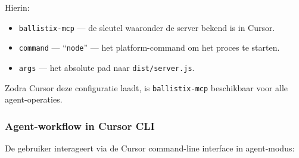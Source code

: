 Hierin:

\begin{itemize}
  \item \texttt{ballistix-mcp} — de sleutel waaronder de server bekend is in Cursor.
  \item \texttt{command} — ``\texttt{node}'' — het platform-command om het proces te starten.
  \item \texttt{args} — het absolute pad naar \texttt{dist/server.js}.
\end{itemize}

Zodra Cursor deze configuratie laadt, is \texttt{ballistix-mcp} beschikbaar voor alle agent-operaties.

\subsubsection{Agent-workflow in Cursor CLI}

De gebruiker interageert via de Cursor command-line interface in agent-modus:

